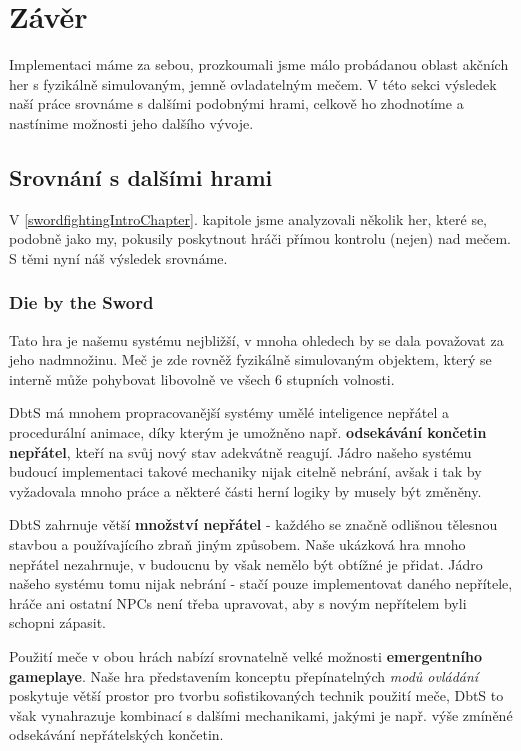 \chapter{Závěr} \label{endChapter}

Implementaci máme za sebou, prozkoumali jsme málo probádanou oblast akčních her s fyzikálně simulovaným, jemně ovladatelným mečem. V této sekci výsledek naší práce srovnáme s dalšími podobnými hrami, celkově ho zhodnotíme a nastínime možnosti jeho dalšího vývoje. 

\section{Srovnání s dalšími hrami}

V \ref{swordfightingIntroChapter}. kapitole jsme analyzovali několik her, které se, podobně jako my, pokusily poskytnout hráči přímou kontrolu (nejen) nad mečem. S těmi nyní náš výsledek srovnáme.

\subsection{Die by the Sword}

Tato hra je našemu systému nejbližší, v mnoha ohledech by se dala považovat za jeho nadmnožinu. Meč je zde rovněž fyzikálně simulovaným objektem, který se interně může pohybovat libovolně ve všech 6 stupních volnosti. 

\acl{DbtS} má mnohem propracovanější systémy umělé inteligence nepřátel a procedurální animace, díky kterým je umožněno např. \textbf{odsekávání končetin nepřátel}, kteří na svůj nový stav adekvátně reagují. Jádro našeho systému budoucí implementaci takové mechaniky nijak citelně nebrání, avšak i tak by vyžadovala mnoho práce a některé části herní logiky by musely být změněny. 

\acl{DbtS} zahrnuje větší \textbf{množství nepřátel} - každého se značně odlišnou tělesnou stavbou a používajícího zbraň jiným způsobem. Naše ukázková hra mnoho nepřátel nezahrnuje, v budoucnu by však nemělo být obtížné je přidat. Jádro našeho systému tomu nijak nebrání - stačí pouze implementovat daného nepřítele, hráče ani ostatní \acs{NPC}s není třeba upravovat, aby s novým nepřítelem byli schopni zápasit.  

Použití meče v obou hrách nabízí srovnatelně velké možnosti \textbf{emergentního gameplaye}. Naše hra představením konceptu přepínatelných \textit{modů ovládání} poskytuje větší prostor pro tvorbu sofistikovaných technik použití meče, \acl{DbtS} to však vynahrazuje kombinací s dalšími mechanikami, jakými je např. výše zmíněné odsekávání nepřátelských končetin. 

